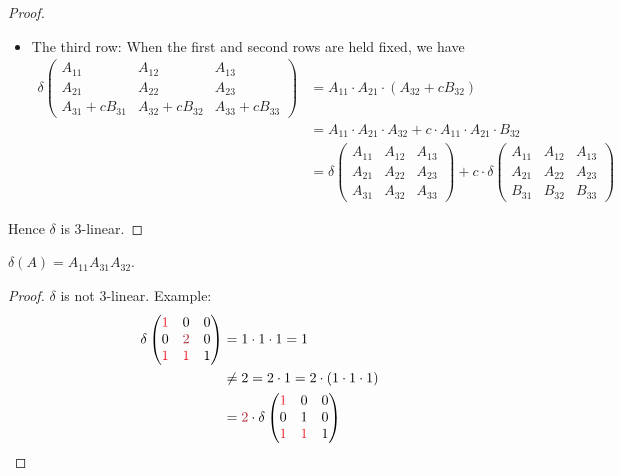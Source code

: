 \begin{proof}
\begin{itemize}
\item The third row: When the first and second rows are held fixed, we have
\begin{align*}
    \delta\begin{pmatrix}
        A_{11} & A_{12} & A_{13} \\
        A_{21} & A_{22} & A_{23} \\
        A_{31}+c B_{31} & A_{32}+c B_{32} & A_{33}+c B_{33}
    \end{pmatrix}
    & = A_{11} \cdot A_{21} \cdot \left( A_{32} + c B_{32} \right) \\
    & = A_{11} \cdot A_{21} \cdot A_{32} + c \cdot A_{11} \cdot A_{21} \cdot B_{32} \\
    & = \delta\begin{pmatrix}
        A_{11} & A_{12} & A_{13} \\
        A_{21} & A_{22} & A_{23} \\
        A_{31} & A_{32} & A_{33}
    \end{pmatrix}
    + c \cdot \delta\begin{pmatrix}
        A_{11} & A_{12} & A_{13} \\
        A_{21} & A_{22} & A_{23} \\
        B_{31} & B_{32} & B_{33}
    \end{pmatrix}
\end{align*}
\end{itemize}
Hence \(\delta\) is \(3\)-linear.
\end{proof}

\begin{exercise} \label{exercise 4.5.8}
\(\delta(A)= A_{11}A_{31}A_{32}\).
\end{exercise}

\begin{proof}
\(\delta\) is not \(3\)-linear. Example:
\begin{align*}
    \delta \begin{pmatrix}
        \RED{1} & 0 & 0 \\
        0 & \MAROON{2} & 0 \\
        \RED{1} & \RED{1} & 1
    \end{pmatrix}
        & = 1 \cdot 1 \cdot 1 = 1 \\
        & \neq 2 = 2 \cdot 1 = 2 \cdot (1 \cdot 1 \cdot 1) \\
        & = \MAROON{2} \cdot \delta \begin{pmatrix}
            \RED{1} & 0 & 0 \\
            0 & 1 & 0 \\
            \RED{1} & \RED{1} & 1
        \end{pmatrix}
\end{align*}
\end{proof}

